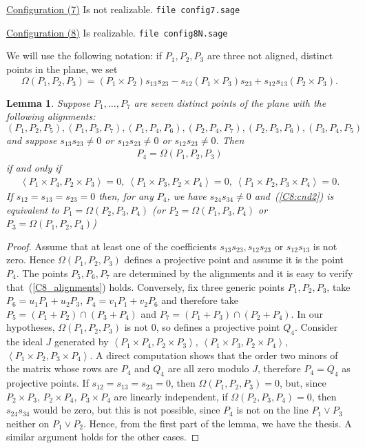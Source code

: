 \documentclass{amsart}
\theoremstyle{plain}
\newtheorem{lemma}{Lemma}[section]
\theoremstyle{definition}
\newcommand{\scl}[2]{\left\langle {#1}, {#2} \right\rangle}
\begin{document}


\underline{Configuration (7)} Is not realizable.
\verb+file config7.sage+



\underline{Configuration (8)} Is realizable.
\verb+file config8N.sage+

We will use the following notation:
if $P_1, P_2, P_3$ are three not aligned, distinct points in the plane,
we set
\[
\Omega(P_1, P_2, P_3) = (P_1 \times P_2)s_{13}s_{23} -
  s_{12}(P_1 \times P_3)s_{23} + s_{12}s_{13}(P_2 \times P_3).
\]

\begin{lemma}
  Suppose $P_1, \dots, P_7$ are seven distinct points of the plane with the
  following alignments:
\begin{equation}
  \label{C8_alignments}
(P_1, P_2, P_5), (P_1, P_3, P_7), (P_1, P_4, P_6), (P_2, P_4, P_7),
(P_2, P_3, P_6),(P_3, P_4, P_5)
\end{equation}
and suppose $s_{13}s_{23} \not = 0$ or $s_{12}s_{23} \not = 0$ or
$s_{12}s_{23} \not = 0$.
Then
\begin{gather}
P_4 = \Omega(P_1, P_2, P_3)
  \label{C8:cnd1}
\end{gather}
if and only if
\begin{gather}
  \label{C8:cnd2}
  \scl{P_1\times P_4}{P_2 \times P_3} = 0,\
  \scl{P_1\times P_3}{P_2 \times P_4} = 0,\
  \scl{P_1\times P_2}{P_3 \times P_4} = 0.
\end{gather}
If $s_{12} = s_{13} = s_{23} = 0$ then, for any $P_4$, we have
$s_{24} s_{34} \not = 0$ and~(\ref{C8:cnd2}) is equivalent to
$P_1 = \Omega(P_2, P_3, P_4)$ (or $P_2 = \Omega(P_1, P_3, P_4)$
or $P_3 = \Omega(P_1, P_2, P_4)$)
\end{lemma}
\begin{proof}
Assume that at least one of the coefficients $s_{13}s_{23}, s_{12}s_{23}$
or $s_{12}s_{13}$ is not zero. Hence $\Omega(P_1, P_2, P_3)$ defines a
projective point and assume it is the point $P_4$. The points $P_5, P_6, P_7$
are determined by the alignments and it is easy to verify
that~(\ref{C8_alignments}) holds.
Conversely, fix three generic points $P_1, P_2, P_3$, take
$P_6 = u_1P_1+u_2P_3$, $P_4 = v_1P_1+v_2P_6$ and therefore take
$P_5 = (P_1+P_2) \cap (P_3+P_4)$ and $P_7 = (P_1+P_3) \cap (P_2+P_4)$.
In our hypotheses, $\Omega(P_1, P_2, P_3)$ is not $0$,
so defines a projective point $Q_4$. Consider the ideal $J$ generated
by $\scl{P_1\times P_4}{P_2\times P_3}$,
$\scl{P_1\times P_3}{P_2\times P_4}$,
$\scl{P_1\times P_2}{P_3\times P_4}$. A direct computation shows that
the order two minors of the matrix whose rows are $P_4$ and $Q_4$ are all
zero modulo $J$, therefore $P_4 = Q_4$ as projective points.
If $s_{12} = s_{13} = s_{23} = 0$, then $\Omega(P_1, P_2, P_3) = 0$,
but, since $P_2 \times P_3$, $P_2 \times P_4$, $P_3 \times P_4$ are linearly
independent, if $\Omega(P_2, P_3, P_4) = 0$, then $s_{24}s_{34}$ would be
zero, but this is not possible, since $P_4$ is not on the line $P_1\vee P_3$
neither on $P_1\vee P_2$. Hence, from the first part of the lemma, we have the
thesis. A similar argument holds for the other cases.
\end{proof}
\end{document}
